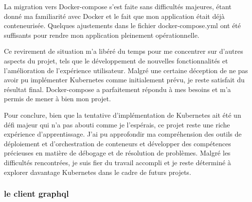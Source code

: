 La migration vers Docker-compose s'est faite sans difficultés majeures, étant donné ma familiarité avec Docker et le fait que mon application était déjà conteneurisée.
Quelques ajustements dans le fichier docker-compose.yml ont été suffisants pour rendre mon application pleinement opérationnelle.

Ce revirement de situation m'a libéré du temps pour me concentrer sur d'autres aspects du projet,
tels que le développement de nouvelles fonctionnalités et l'amélioration de l'expérience utilisateur.
Malgré une certaine déception de ne pas avoir pu implémenter Kubernetes comme initialement prévu, je reste satisfait du résultat final.
Docker-compose a parfaitement répondu à mes besoins et m'a permis de mener à bien mon projet.

Pour conclure, bien que la tentative d'implémentation de Kubernetes ait été un défi majeur qui n'a pas abouti comme je l'espérais,
ce projet reste une riche expérience d'apprentissage.
J'ai pu approfondir ma compréhension des outils de déploiement et d'orchestration de conteneurs et développer des compétences précieuses en matière de débogage et de résolution de problèmes.
Malgré les difficultés rencontrées, je suis fier du travail accompli et je reste déterminé à explorer davantage Kubernetes dans le cadre de futurs projets.

\subsubsection{le client graphql}


